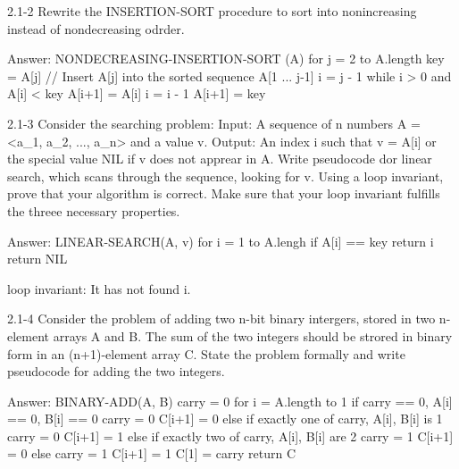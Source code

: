 2.1-2
Rewrite the INSERTION-SORT procedure to sort into nonincreasing instead of nondecreasing odrder.

Answer:
NONDECREASING-INSERTION-SORT (A)
  for j = 2 to A.length
    key = A[j]
    // Insert A[j] into the sorted sequence A[1 ... j-1]
    i = j - 1
    while i > 0 and A[i] < key
      A[i+1] = A[i]
      i = i - 1
    A[i+1] = key
    
2.1-3
Consider the searching problem:
  Input: A sequence of n numbers A = <a_1, a_2, ..., a_n> and a value v.
  Output: An index i such that v = A[i] or the special value NIL if v does not apprear in A.
Write pseudocode dor linear search, which scans through the sequence, looking for v. Using a loop invariant, prove that your algorithm is correct. Make sure that your loop invariant fulfills the threee necessary properties.

Answer:
LINEAR-SEARCH(A, v)
  for i = 1 to A.lengh
    if A[i] == key
      return i
  return NIL
  
loop invariant: It has not found i.
  
2.1-4
Consider the problem of adding two n-bit binary intergers, stored in two n-element arrays A and B. The sum of the two integers should be strored in binary form in an (n+1)-element array C. State the problem formally and write pseudocode for adding the two integers.

Answer:
BINARY-ADD(A, B)
  carry = 0
  for i = A.length to 1
    if carry == 0, A[i] == 0, B[i] == 0
      carry = 0
      C[i+1] = 0
    else if exactly one of carry, A[i], B[i] is 1
      carry = 0
      C[i+1] = 1
    else if exactly two of carry, A[i], B[i] are 2
      carry = 1
      C[i+1] = 0
    else 
      carry = 1
      C[i+1] = 1
  C[1] = carry
  return C

      
